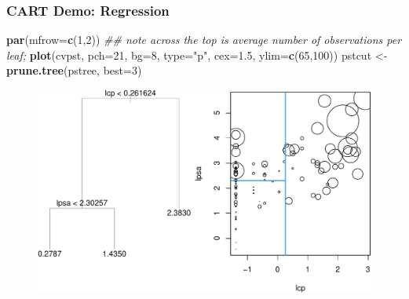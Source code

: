 \documentclass[
  shownotes,
  xcolor={svgnames},
  hyperref={colorlinks,citecolor=DarkBlue,linkcolor=DarkRed,urlcolor=DarkBlue}
  , aspectratio=169]{beamer}
\newenvironment{Shaded}{\begin{snugshade}}{\end{snugshade}}
\newcommand{\CommentTok}[1]{\textcolor[rgb]{0.56,0.35,0.01}{\textit{#1}}}
\newcommand{\DataTypeTok}[1]{\textcolor[rgb]{0.13,0.29,0.53}{#1}}
\newcommand{\DecValTok}[1]{\textcolor[rgb]{0.00,0.00,0.81}{#1}}
\newcommand{\FloatTok}[1]{\textcolor[rgb]{0.00,0.00,0.81}{#1}}
\newcommand{\KeywordTok}[1]{\textcolor[rgb]{0.13,0.29,0.53}{\textbf{#1}}}
\newcommand{\NormalTok}[1]{#1}
\newcommand{\StringTok}[1]{\textcolor[rgb]{0.31,0.60,0.02}{#1}}
\begin{document}
\begin{frame}[fragile]
\frametitle{CART Demo: Regression}

\begin{scriptsize}
\begin{Shaded}
\begin{Highlighting}[]
\KeywordTok{par}\NormalTok{(}\DataTypeTok{mfrow=}\KeywordTok{c}\NormalTok{(}\DecValTok{1}\NormalTok{,}\DecValTok{2}\NormalTok{))}
\CommentTok{\#\# note across the top is \textquotesingle{}average number of observations per leaf\textquotesingle{}; }
\KeywordTok{plot}\NormalTok{(cvpst, }\DataTypeTok{pch=}\DecValTok{21}\NormalTok{, }\DataTypeTok{bg=}\DecValTok{8}\NormalTok{, }\DataTypeTok{type=}\StringTok{"p"}\NormalTok{, }\DataTypeTok{cex=}\FloatTok{1.5}\NormalTok{, }\DataTypeTok{ylim=}\KeywordTok{c}\NormalTok{(}\DecValTok{65}\NormalTok{,}\DecValTok{100}\NormalTok{))}
\NormalTok{pstcut \textless{}{-}}\StringTok{ }\KeywordTok{prune.tree}\NormalTok{(pstree, }\DataTypeTok{best=}\DecValTok{3}\NormalTok{)}

\end{Highlighting}
\end{Shaded}
\end{scriptsize}

\begin{figure}[H] \centering
            \captionsetup{justification=centering}
              \includegraphics[scale=0.55]{figures/unnamed-chunk-6-1.pdf}
 \end{figure}


\end{frame}
\end{document}
